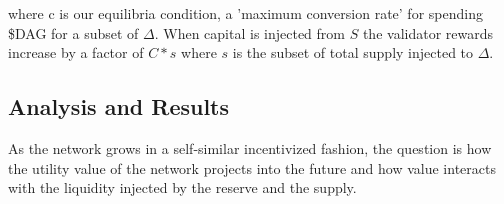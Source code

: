 \documentclass{article}
\begin{document}
where c is our equilibria condition, a 'maximum conversion rate' for spending \$DAG for a subset of $\Delta$. When capital is injected from $S$ the validator rewards increase by a factor of $C*s$ where $s$ is the subset of total supply injected to $\Delta$.

\subsection{Analysis and Results}
As the network grows in a self-similar incentivized fashion, the question is how the utility value of the network projects into the future and how value interacts with the 
liquidity injected by the reserve and the supply.

\end{document}
